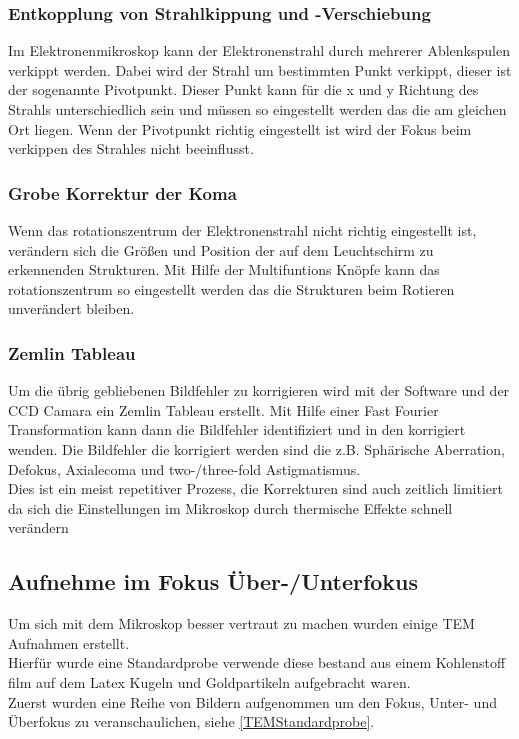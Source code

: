 \subsubsection{Entkopplung von Strahlkippung und -Verschiebung}
Im Elektronenmikroskop kann der Elektronenstrahl durch mehrerer Ablenkspulen verkippt werden. Dabei wird der Strahl um bestimmten Punkt verkippt, dieser ist der sogenannte Pivotpunkt. Dieser Punkt kann für die x und y Richtung des Strahls unterschiedlich sein und müssen so eingestellt werden das die am gleichen Ort liegen. Wenn der Pivotpunkt richtig eingestellt ist wird der Fokus beim verkippen des Strahles nicht beeinflusst.

\subsubsection{Grobe Korrektur der Koma}
Wenn das rotationszentrum der Elektronenstrahl nicht richtig eingestellt ist, verändern sich die Größen und Position der auf dem Leuchtschirm zu erkennenden Strukturen. Mit Hilfe der Multifuntions Knöpfe kann das rotationszentrum so eingestellt werden das die Strukturen beim Rotieren unverändert bleiben.

\subsubsection{Zemlin Tableau}
Um die übrig gebliebenen Bildfehler zu korrigieren wird mit der Software und der CCD Camara ein Zemlin Tableau erstellt. Mit Hilfe einer Fast Fourier Transformation kann dann die Bildfehler identifiziert und in den korrigiert wenden. Die Bildfehler die korrigiert werden sind die z.B. Sphärische Aberration, Defokus, Axialecoma und two-/three-fold Astigmatismus.\\
Dies ist ein meist repetitiver Prozess, die Korrekturen sind auch zeitlich limitiert da sich die Einstellungen im Mikroskop durch thermische Effekte schnell verändern


\subsection{Aufnehme im Fokus Über-/Unterfokus}

Um sich mit dem Mikroskop besser vertraut zu machen wurden einige TEM Aufnahmen erstellt.\\
Hierfür wurde eine Standardprobe verwende diese bestand aus einem Kohlenstoff film auf dem Latex Kugeln und Goldpartikeln aufgebracht waren.\\
Zuerst wurden eine Reihe von Bildern aufgenommen um den Fokus, Unter- und Überfokus zu veranschaulichen, siehe \cref{TEMStandardprobe}.



